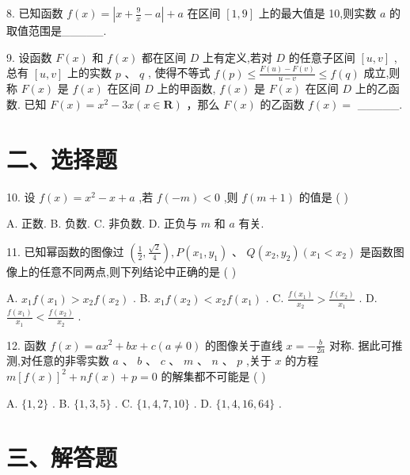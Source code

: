 8. 已知函数 $f\left( x\right)  = \left| {x + \frac{9}{x} - a}\right|  + a$ 在区间 $\left\lbrack  {1,9}\right\rbrack$ 上的最大值是 10,则实数 $a$ 的取值范围是\_\_\_\_\_.

9. 设函数 $F\left( x\right)$ 和 $f\left( x\right)$ 都在区间 $D$ 上有定义,若对 $D$ 的任意子区间 $\left\lbrack  {u,v}\right\rbrack$ ,总有 $\left\lbrack  {u,v}\right\rbrack$ 上的实数 $p\text{ 、 }q$ , 使得不等式 $f\left( p\right)  \leq  \frac{F\left( u\right)  - F\left( v\right) }{u - v} \leq  f\left( q\right)$ 成立,则称 $F\left( x\right)$ 是 $f\left( x\right)$ 在区间 $D$ 上的甲函数, $f\left( x\right)$ 是 $F\left( x\right)$ 在区间 $D$ 上的乙函数. 已知 $F\left( x\right)  = {x}^{2} - {3x}\left( {x \in  \mathbf{R}}\right)$ ，那么 $F\left( x\right)$ 的乙函数 $f\left( x\right)  =$ \_\_\_\_\_.

\section*{二、选择题}

10. 设 $f\left( x\right)  = {x}^{2} - x + a$ ,若 $f\left( {-m}\right)  < 0$ ,则 $f\left( {m + 1}\right)$ 的值是 ( )

A. 正数. B. 负数. C. 非负数. D. 正负与 $m$ 和 $a$ 有关.

11. 已知幂函数的图像过 $\left( {\frac{1}{2},\frac{\sqrt{2}}{4}}\right) ,P\left( {{x}_{1},{y}_{1}}\right) \text{ 、 }Q\left( {{x}_{2},{y}_{2}}\right) \left( {{x}_{1} < {x}_{2}}\right)$ 是函数图像上的任意不同两点,则下列结论中正确的是 ( )

A. ${x}_{1}f\left( {x}_{1}\right)  > {x}_{2}f\left( {x}_{2}\right)$ . B. ${x}_{1}f\left( {x}_{2}\right)  < {x}_{2}f\left( {x}_{1}\right)$ . C. $\frac{f\left( {x}_{1}\right) }{{x}_{2}} > \frac{f\left( {x}_{2}\right) }{{x}_{1}}$ . D. $\frac{f\left( {x}_{1}\right) }{{x}_{1}} < \frac{f\left( {x}_{2}\right) }{{x}_{2}}$ .

12. 函数 $f\left( x\right)  = a{x}^{2} + {bx} + c\left( {a \neq  0}\right)$ 的图像关于直线 $x =  - \frac{b}{2a}$ 对称. 据此可推测,对任意的非零实数 $a$ 、 $b\text{ 、 }c\text{ 、 }m\text{ 、 }n\text{ 、 }p$ ,关于 $x$ 的方程 $m{\left\lbrack  f\left( x\right) \right\rbrack  }^{2} + {nf}\left( x\right)  + p = 0$ 的解集都不可能是 ( )

A. $\{ 1,2\}$ . B. $\{ 1,3,5\}$ . C. $\{ 1,4,7,{10}\}$ . D. $\{ 1,4,{16},{64}\}$ .

\section*{三、解答题}

